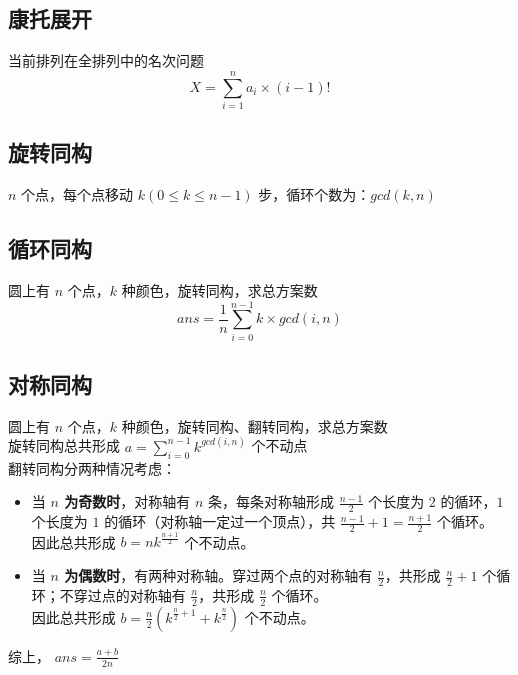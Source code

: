\subsection{康托展开}
当前排列在全排列中的名次问题
$$
X = \sum_{i = 1}^n a_i \times (i - 1)!
$$
\subsection{旋转同构}
$n$ 个点，每个点移动 $k(0 \leq k \leq n - 1)$ 步，循环个数为：$gcd(k, n)$
\subsection{循环同构}
圆上有 $n$ 个点，$k$ 种颜色，旋转同构，求总方案数
$$
ans = \frac{1}{n}\sum_{i = 0}^{n - 1} k \times gcd(i, n)
$$
\subsection{对称同构}
圆上有 $n$ 个点，$k$ 种颜色，旋转同构、翻转同构，求总方案数 \\
\hspace*{0.7cm} 旋转同构总共形成 $a = \sum_{i = 0}^{n - 1} k^{gcd(i, n)}$ 个不动点 \\
\hspace*{0.7cm} 翻转同构分两种情况考虑：
\begin{itemize}
	\item 当\textbf{ $n$ 为奇数时}，对称轴有 $n$ 条，每条对称轴形成 $\frac{n - 1}{2}$ 个长度为 $2$ 的循环，$1$ 个长度为 $1$ 的循环（对称轴一定过一个顶点），共 $\frac{n - 1}{2} + 1 = \frac{n + 1}{2}$ 个循环。 \\ 因此总共形成 $b = nk^{\frac{n + 1}{2}}$ 个不动点。
	\item 当\textbf{ $n$ 为偶数时}，有两种对称轴。穿过两个点的对称轴有 $\frac{n}{2}$，共形成 $\frac{n}{2} + 1$ 个循环；不穿过点的对称轴有 $\frac{n}{2}$，共形成 $\frac{n}{2}$ 个循环。 \\ 因此总共形成 $b = \frac{n}{2}\left(k^{\frac{n}{2} + 1} + k^{\frac{n}{2}}\right)$ 个不动点。
\end{itemize}
\hspace*{0.7cm} 综上， $ans = \frac{a + b}{2n}$